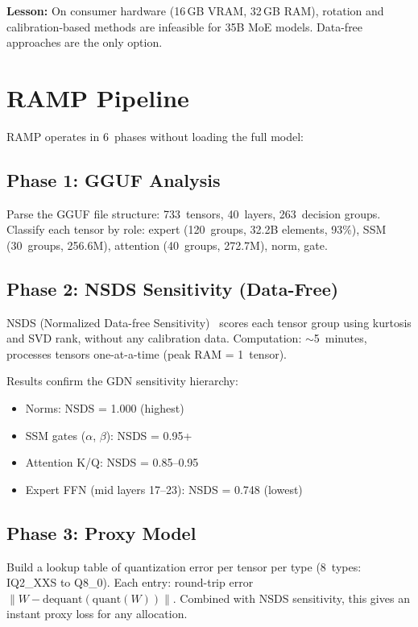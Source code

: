 \documentclass[10pt,a4paper]{article}
\begin{document}
\textbf{Lesson:} On consumer hardware (16\,GB VRAM, 32\,GB RAM), rotation and calibration-based methods are infeasible for 35B MoE models. Data-free approaches are the only option.

\section{RAMP Pipeline}

RAMP operates in 6~phases without loading the full model:

\subsection{Phase 1: GGUF Analysis}

Parse the GGUF file structure: 733~tensors, 40~layers, 263~decision groups. Classify each tensor by role: expert (120~groups, 32.2B elements, 93\%), SSM (30~groups, 256.6M), attention (40~groups, 272.7M), norm, gate.

\subsection{Phase 2: NSDS Sensitivity (Data-Free)}

NSDS (Normalized Data-free Sensitivity)~\cite{nsds2024} scores each tensor group using kurtosis and SVD rank, without any calibration data. Computation: $\sim$5~minutes, processes tensors one-at-a-time (peak RAM = 1~tensor).

Results confirm the GDN sensitivity hierarchy:
\begin{itemize}
  \item Norms: NSDS = 1.000 (highest)
  \item SSM gates ($\alpha$, $\beta$): NSDS = 0.95+
  \item Attention K/Q: NSDS = 0.85--0.95
  \item Expert FFN (mid layers 17--23): NSDS = 0.748 (lowest)
\end{itemize}

\subsection{Phase 3: Proxy Model}

Build a lookup table of quantization error per tensor per type (8~types: IQ2\_XXS to Q8\_0). Each entry: round-trip error $\|W - \text{dequant}(\text{quant}(W))\|$. Combined with NSDS sensitivity, this gives an instant proxy loss for any allocation.
\end{document}
